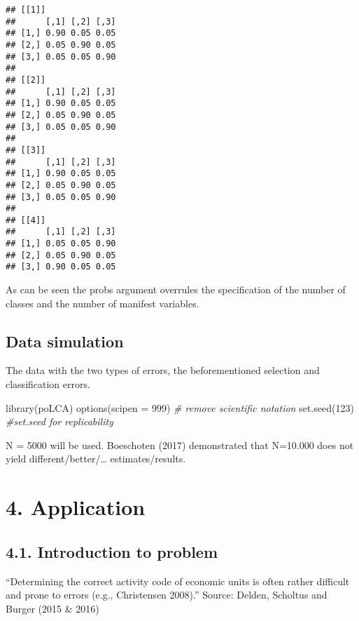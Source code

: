 \documentclass[
]{article}
\newenvironment{Shaded}{\begin{snugshade}}{\end{snugshade}}
\newcommand{\AttributeTok}[1]{\textcolor[rgb]{0.77,0.63,0.00}{#1}}
\newcommand{\CommentTok}[1]{\textcolor[rgb]{0.56,0.35,0.01}{\textit{#1}}}
\newcommand{\DecValTok}[1]{\textcolor[rgb]{0.00,0.00,0.81}{#1}}
\newcommand{\FunctionTok}[1]{\textcolor[rgb]{0.00,0.00,0.00}{#1}}
\newcommand{\NormalTok}[1]{#1}
\begin{document}
\begin{verbatim}
## [[1]]
##      [,1] [,2] [,3]
## [1,] 0.90 0.05 0.05
## [2,] 0.05 0.90 0.05
## [3,] 0.05 0.05 0.90
## 
## [[2]]
##      [,1] [,2] [,3]
## [1,] 0.90 0.05 0.05
## [2,] 0.05 0.90 0.05
## [3,] 0.05 0.05 0.90
## 
## [[3]]
##      [,1] [,2] [,3]
## [1,] 0.90 0.05 0.05
## [2,] 0.05 0.90 0.05
## [3,] 0.05 0.05 0.90
## 
## [[4]]
##      [,1] [,2] [,3]
## [1,] 0.05 0.05 0.90
## [2,] 0.05 0.90 0.05
## [3,] 0.90 0.05 0.05
\end{verbatim}

As can be seen the probs argument overrules the specification of the
number of classes and the number of manifest variables.

\hypertarget{data-simulation}{%
\subsection{Data simulation}\label{data-simulation}}

The data with the two types of errors, the beforementioned selection and
classification errors.

\begin{Shaded}
\begin{Highlighting}[]
\FunctionTok{library}\NormalTok{(poLCA) }
\FunctionTok{options}\NormalTok{(}\AttributeTok{scipen =} \DecValTok{999}\NormalTok{) }\CommentTok{\# remove scientific notation}
\FunctionTok{set.seed}\NormalTok{(}\DecValTok{123}\NormalTok{) }\CommentTok{\#set.seed for replicability}
\end{Highlighting}
\end{Shaded}

N = 5000 will be used. Boeschoten (2017) demonstrated that N=10.000 does
not yield different/better/\ldots{} estimates/results.

\hypertarget{application}{%
\section{4. Application}\label{application}}

\hypertarget{introduction-to-problem}{%
\subsection{4.1. Introduction to
problem}\label{introduction-to-problem}}

``Determining the correct activity code of economic units is often
rather difficult and prone to errors (e.g., Christensen 2008).'' Source:
Delden, Scholtus and Burger (2015 \& 2016)
\end{document}
